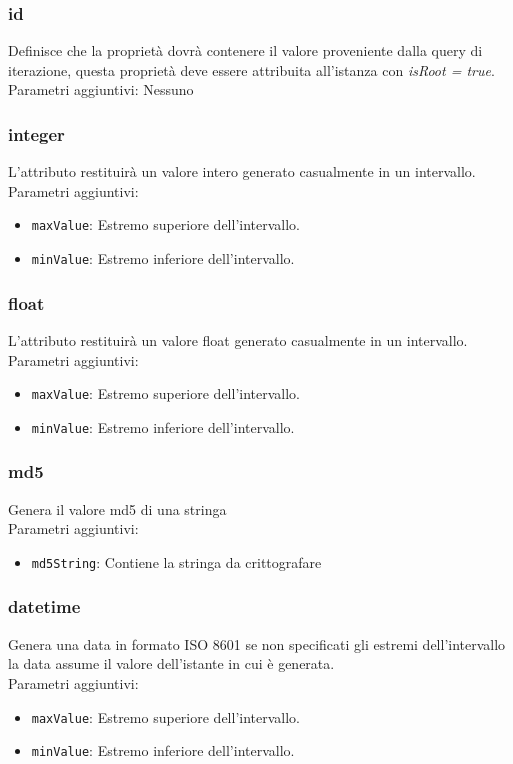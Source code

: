 \documentclass[12pt,a4paper,italian]{article}
\begin{document}
\subsubsection{id}  Definisce che la proprietà dovrà contenere il valore proveniente dalla query di iterazione, 
questa proprietà deve essere attribuita all'istanza con \emph{isRoot = true}.\\
Parametri aggiuntivi: Nessuno
\subsubsection{integer} L'attributo restituirà un valore intero generato casualmente in un intervallo.\\
Parametri aggiuntivi:
\begin{itemize}
	\item \texttt{maxValue}: Estremo superiore dell'intervallo.
	\item \texttt{minValue}: Estremo inferiore dell'intervallo.
\end{itemize}
\subsubsection{float} L'attributo restituirà un valore float generato casualmente in un intervallo.\\
Parametri aggiuntivi:
\begin{itemize}
	\item \texttt{maxValue}: Estremo superiore dell'intervallo.
	\item \texttt{minValue}: Estremo inferiore dell'intervallo.
\end{itemize}
\subsubsection{md5} Genera il valore md5 di una stringa\\
Parametri aggiuntivi:
\begin{itemize}
	\item \texttt{md5String}: Contiene la stringa da crittografare
\end{itemize}
\subsubsection{datetime} Genera una data in formato ISO 8601 se non specificati gli estremi dell'intervallo la data assume il valore dell'istante in cui è generata.\\
Parametri aggiuntivi:
\begin{itemize}
	\item \texttt{maxValue}: Estremo superiore dell'intervallo.
	\item \texttt{minValue}: Estremo inferiore dell'intervallo.
\end{itemize}
\end{document}
